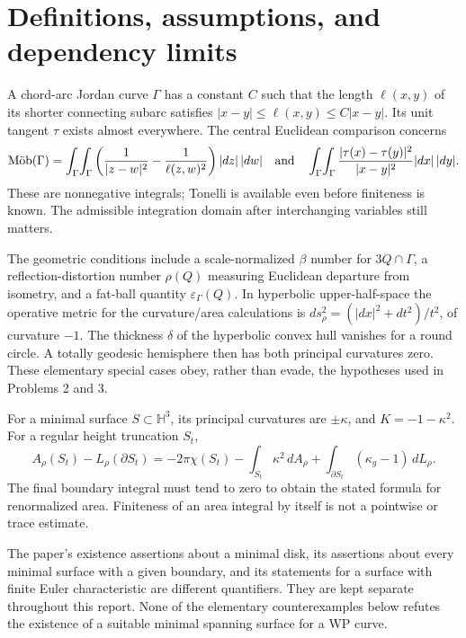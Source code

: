 \documentclass[10pt]{article}
\begin{document}
\section*{Definitions, assumptions, and dependency limits}
A chord-arc Jordan curve \(\Gamma\) has a constant \(C\) such that the length \(\ell(x,y)\) of its shorter connecting subarc satisfies \(|x-y|\leq\ell(x,y)\leq C|x-y|\). Its unit tangent \(\tau\) exists almost everywhere. The central Euclidean comparison concerns \[\operatorname{M\ddot ob}(\Gamma)
 =\int_\Gamma\!\int_\Gamma\left(\frac1{|z-w|^2}-\frac1{\ell(z,w)^2}\right)|dz|\,|dw|
\quad\hbox{and}\quad
 \int_\Gamma\!\int_\Gamma\frac{|\tau(x)-\tau(y)|^2}{|x-y|^2}|dx|\,|dy|.\] These are nonnegative integrals; Tonelli is available even before finiteness is known. The admissible integration domain after interchanging variables still matters.\par
The geometric conditions include a scale-normalized \(\beta\) number for \(3Q\cap\Gamma\), a reflection-distortion number \(\rho(Q)\) measuring Euclidean departure from isometry, and a fat-ball quantity \(\varepsilon_\Gamma(Q)\). In hyperbolic upper-half-space the operative metric for the curvature/area calculations is \(ds_\rho^2=(|dx|^2+dt^2)/t^2\), of curvature \(-1\). The thickness \(\delta\) of the hyperbolic convex hull vanishes for a round circle. A totally geodesic hemisphere then has both principal curvatures zero. These elementary special cases obey, rather than evade, the hypotheses used in Problems 2 and 3.\par
For a minimal surface \(S\subset\mathbb H^3\), its principal curvatures are \(\pm\kappa\), and \(K=-1-\kappa^2\). For a regular height truncation \(S_t\), \[A_\rho(S_t)-L_\rho(\partial S_t)
 =-2\pi\chi(S_t)-\int_{S_t}\kappa^2\,dA_\rho
   +\int_{\partial S_t}(\kappa_g-1)\,dL_\rho.\] The final boundary integral must tend to zero to obtain the stated formula for renormalized area. Finiteness of an area integral by itself is not a pointwise or trace estimate.\par
The paper’s existence assertions about a minimal disk, its assertions about every minimal surface with a given boundary, and its statements for a surface with finite Euler characteristic are different quantifiers. They are kept separate throughout this report. None of the elementary counterexamples below refutes the existence of a suitable minimal spanning surface for a WP curve.\par
\end{document}
